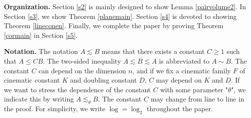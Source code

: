 \documentclass[11pt,a4paper,reqno]{amsart}
\newcommand{\calL}{\mathcal{L}}
\newcommand{\calC}{\mathcal{C}}
\newcommand{\1}{\mathbf{1}}
\numberwithin{equation}{section}
\theoremstyle{plain}
\theoremstyle{definition}
\theoremstyle{remark}
\begin{document}




\bigskip
\noindent
{\bf Organization.}
Section \ref{s2} is mainly designed to show Lemma \ref{pairvolume2}.
In Section \ref{s3}, we show Theorem \ref{planemain}.
Section \ref{s4} is devoted to showing Theorem \ref{lineconen}.
Finally, we complete the paper by proving Theorem \ref{cormain} in Section \ref{s5}.

\bigskip
\noindent
{\bf Notation.}
The notation $A \lesssim B$ means that there exists a constant $C \geq 1$ such that $A \leq CB$. The two-sided inequality $A \lesssim B \lesssim A$ is abbreviated to $A \sim B$. The constant $C$ can depend on the dimension $n$, and if we fix a cinematic family $F$ of cinematic constant $K$ and doubling constant $D$, $C$ may depend on $K$ and $D$.
If we want to stress the dependence of the constant $C$ with some  parameter "$\theta$", we indicate this by writing $A \lesssim_{\theta} B$. The constant $C$ may change from line to line in the proof. For simplicity, we write $\log=\log_2$ throughout the paper.
\end{document}

